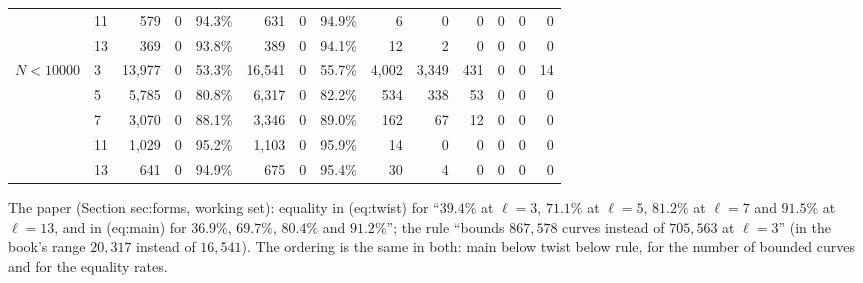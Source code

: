 \begin{sloppypar}
\begin{example}
\begin{center}
\begin{tabular}{llrrrrrrrrrrrr}
 & 11 & 579 & 0 & 94.3\% & 631 & 0 & 94.9\% & 6 & 0 & 0 & 0 & 0 & 0\\
 & 13 & 369 & 0 & 93.8\% & 389 & 0 & 94.1\% & 12 & 2 & 0 & 0 & 0 & 0\\
$N<10000$ & 3 & 13,977 & 0 & 53.3\% & 16,541 & 0 & 55.7\% & 4,002 & 3,349 & 431 & 0 & 0 & 14\\
 & 5 & 5,785 & 0 & 80.8\% & 6,317 & 0 & 82.2\% & 534 & 338 & 53 & 0 & 0 & 0\\
 & 7 & 3,070 & 0 & 88.1\% & 3,346 & 0 & 89.0\% & 162 & 67 & 12 & 0 & 0 & 0\\
 & 11 & 1,029 & 0 & 95.2\% & 1,103 & 0 & 95.9\% & 14 & 0 & 0 & 0 & 0 & 0\\
 & 13 & 641 & 0 & 94.9\% & 675 & 0 & 95.4\% & 30 & 4 & 0 & 0 & 0 & 0\\
\bottomrule
\end{tabular}
\end{center}
The paper (Section sec:forms, working set): equality in (eq:twist) for ``$39.4\%$ at $\ell=3$, $71.1\%$ at $\ell=5$, $81.2\%$ at $\ell=7$ and $91.5\%$ at $\ell=13$, and in
(eq:main) for $36.9\%$, $69.7\%$, $80.4\%$ and $91.2\%$''; the rule ``bounds $867{,}578$ curves instead of $705{,}563$ at $\ell=3$'' (in the book's range $20{,}317$ instead of
$16{,}541$). The ordering is the same in both: main below twist below rule, for the number of bounded curves and for the equality rates.
\end{example}


\end{sloppypar}
